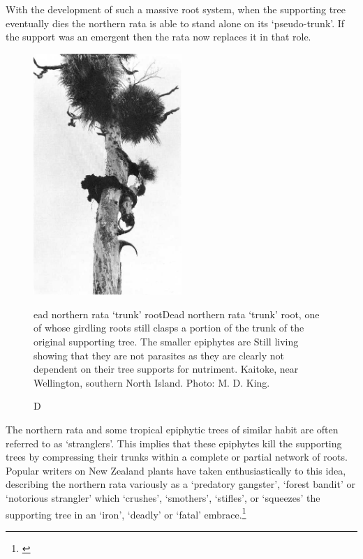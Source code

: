With the development of such a massive root system, when the supporting tree eventually dies the northern rata is able to stand alone on its `pseudo-trunk'.
If the support was an emergent then the rata now replaces it in that role.

\begin{figure}
	\includegraphics[width=0.5\textwidth]{graphics/figure53dead-rata.jpg}
	\centering
	\caption[]Dead northern rata `trunk' root{Dead northern rata `trunk' root, one of whose girdling roots still clasps a portion of the trunk of the original supporting tree.
    The smaller epiphytes are Still living showing that they are not parasites as they are clearly not dependent on their tree supports for nutriment.
    Kaitoke, near Wellington, southern North Island.
	Photo: M. D. King.}
	\label{fig:53dead-rata}
\end{figure}

The northern rata and some tropical epiphytic trees of similar habit are often referred to as `stranglers'.
This implies that these epiphytes kill the supporting trees by compressing their trunks within a complete or partial network of roots.
Popular writers on New Zealand plants have taken enthusiastically to this idea, describing the northern rata variously as a `predatory gangster', `forest bandit' or `notorious strangler' which `crushes', `smothers', `stifles', or `squeezes' the supporting tree in an `iron', `deadly' or `fatal' embrace.\footnote{\cite{druce1971uncle}}

